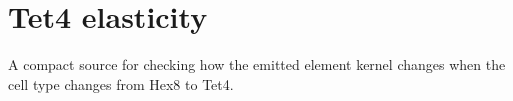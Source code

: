 
\section{Tet4 elasticity}

A compact source for checking how the emitted element kernel changes when the
cell type changes from Hex8 to Tet4.

